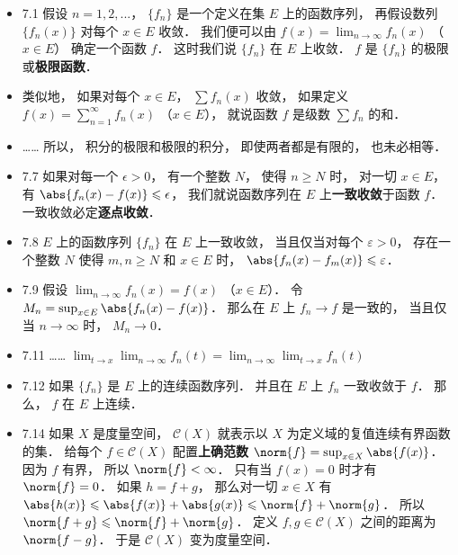 \begin{itemize}
\item 7.1 假设 $n=1,2,...$， $\{f_n\}$ 是一个定义在集 $E$ 上的函数序列， 再假设数列 $\{f_n(x)\}$ 对每个 $x\in E$ 收敛． 我们便可以由 $f(x) = \lim_{n\to\infty} f_n(x)$ （$x\in E$） 确定一个函数 $f$． 这时我们说 $\{f_n\}$ 在 $E$ 上收敛． $f$ 是 $\{f_n\}$ 的极限或\textbf{极限函数}．

\item 类似地， 如果对每个 $x\in E$， $\sum f_n(x)$ 收敛， 如果定义 $f(x) = \sum_{n=1}^\infty f_n(x)$ （$x\in E$）， 就说函数 $f$ 是级数 $\sum f_n$ 的和．

\item …… 所以， 积分的极限和极限的积分， 即使两者都是有限的， 也未必相等．

\item 7.7 如果对每一个 $\epsilon >0$， 有一个整数 $N$， 使得 $n\geqslant N$ 时， 对一切 $x\in E$， 有 $\abs{f_n(x)-f(x)} \leqslant \epsilon$， 我们就说函数序列在 $E$ 上\textbf{一致收敛}于函数 $f$． 一致收敛必定\textbf{逐点收敛}．

\item 7.8 $E$ 上的函数序列 $\{f_n\}$ 在 $E$ 上一致收敛， 当且仅当对每个 $\varepsilon>0$， 存在一个整数 $N$ 使得 $m,n\geqslant N$ 和 $x\in E$ 时， $\abs{f_n(x)-f_m(x)}\leqslant \varepsilon$．

\item 7.9 假设 $\lim_{n\to\infty} f_n(x) = f(x)$ （$x\in E$）． 令 $M_n = \sup_{x\in E} \abs{f_n(x)-f(x)}$． 那么在 $E$ 上 $f_n\to f$ 是一致的， 当且仅当 $n\to \infty$ 时， $M_n\to 0$．

\item 7.11 …… $\lim_{t\to x}\lim_{n\to\infty} f_n(t) = \lim_{n\to\infty}\lim_{t\to x} f_n(t)$

\item 7.12 如果 $\{f_n\}$ 是 $E$ 上的连续函数序列． 并且在 $E$ 上 $f_n$ 一致收敛于 $f$． 那么， $f$ 在 $E$ 上连续．

\item 7.14 如果 $X$ 是度量空间， $\mathscr C(X)$ 就表示以 $X$ 为定义域的复值连续有界函数的集． 给每个 $f\in\mathscr C(X)$ 配置\textbf{上确范数} $\norm{f} = \sup_{x\in X} \abs{f(x)}$． 因为 $f$ 有界， 所以 $\norm{f}<\infty$． 只有当 $f(x)=0$ 时才有 $\norm{f}=0$． 如果 $h=f+g$， 那么对一切 $x\in X$ 有 $\abs{h(x)}\leqslant \abs{f(x)} + \abs{g(x)}\leqslant \norm{f}+\norm{g}$． 所以 $\norm{f+g}\leqslant \norm{f}+\norm{g}$． 定义 $f,g\in\mathscr C(X)$ 之间的距离为 $\norm{f-g}$． 于是 $\mathscr C(X)$ 变为度量空间．


\end{itemize}
